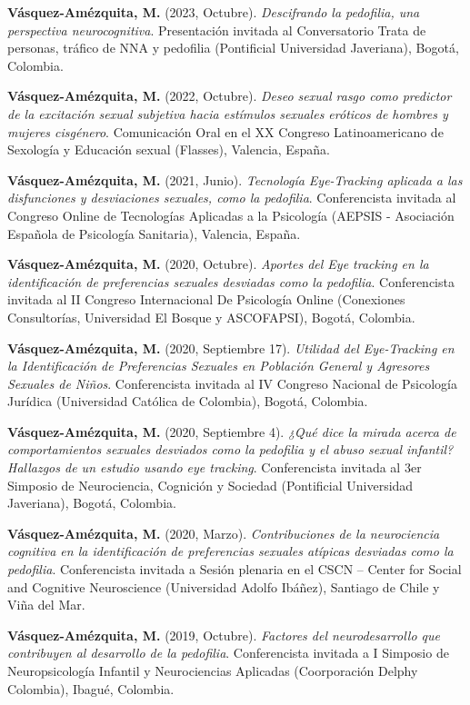 \documentclass[11pt,a4paper,]{awesome-cv}
\begin{document}
\textbf{Vásquez-Amézquita, M.} (2023, Octubre). \emph{Descifrando la
pedofilia, una perspectiva neurocognitiva}. Presentación invitada al
Conversatorio Trata de personas, tráfico de NNA y pedofilia (Pontificial
Universidad Javeriana), Bogotá, Colombia.

\textbf{Vásquez-Amézquita, M.} (2022, Octubre). \emph{Deseo sexual rasgo
como predictor de la excitación sexual subjetiva hacia estímulos
sexuales eróticos de hombres y mujeres cisgénero}. Comunicación Oral en
el XX Congreso Latinoamericano de Sexología y Educación sexual
(Flasses), Valencia, España.

\textbf{Vásquez-Amézquita, M.} (2021, Junio). \emph{Tecnología
Eye-Tracking aplicada a las disfunciones y desviaciones sexuales, como
la pedofilia}. Conferencista invitada al Congreso Online de Tecnologías
Aplicadas a la Psicología (AEPSIS - Asociación Española de Psicología
Sanitaria), Valencia, España.

\textbf{Vásquez-Amézquita, M.} (2020, Octubre). \emph{Aportes del Eye
tracking en la identificación de preferencias sexuales desviadas como la
pedofilia}. Conferencista invitada al II Congreso Internacional De
Psicología Online (Conexiones Consultorías, Universidad El Bosque y
ASCOFAPSI), Bogotá, Colombia.

\textbf{Vásquez-Amézquita, M.} (2020, Septiembre 17). \emph{Utilidad del
Eye-Tracking en la Identificación de Preferencias Sexuales en Población
General y Agresores Sexuales de Niños}. Conferencista invitada al IV
Congreso Nacional de Psicología Jurídica (Universidad Católica de
Colombia), Bogotá, Colombia.

\textbf{Vásquez-Amézquita, M.} (2020, Septiembre 4). \emph{¿Qué dice la
mirada acerca de comportamientos sexuales desviados como la pedofilia y
el abuso sexual infantil? Hallazgos de un estudio usando eye tracking}.
Conferencista invitada al 3er Simposio de Neurociencia, Cognición y
Sociedad (Pontificial Universidad Javeriana), Bogotá, Colombia.

\textbf{Vásquez-Amézquita, M.} (2020, Marzo). \emph{Contribuciones de la
neurociencia cognitiva en la identificación de preferencias sexuales
atípicas desviadas como la pedofilia}. Conferencista invitada a Sesión
plenaria en el CSCN -- Center for Social and Cognitive Neuroscience
(Universidad Adolfo Ibáñez), Santiago de Chile y Viña del Mar.

\textbf{Vásquez-Amézquita, M.} (2019, Octubre). \emph{Factores del
neurodesarrollo que contribuyen al desarrollo de la pedofilia}.
Conferencista invitada a I Simposio de Neuropsicología Infantil y
Neurociencias Aplicadas (Coorporación Delphy Colombia), Ibagué,
Colombia.
\end{document}

